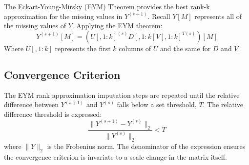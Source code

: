 \documentclass[12pt,twoside]{dukestatscithesis}
\theoremstyle{definition}
\theoremstyle{definition}
\theoremstyle{definition}
\theoremstyle{remark}
\begin{document}
The Eckart-Young-Mirsky (EYM) Theorem provides the best rank-k
approximation for the missing values in \(Y^{(s+1)}\). Recall \(Y[M]\)
represents all of the missing values of \(Y\). Applying the EYM theorem:
\[Y^{(s+1)}[M] = (U[,1:k]^{(s)}D[,1:k]V[,1:k]^{T(s)})[M]\] Where
\(U[,1:k]\) represents the first \(k\) columns of \(U\) and the same for
\(D\) and \(V\).

\subsection{Convergence Criterion}\label{convergence-criterion}

The EYM rank approximation imputation steps are repeated until the
relative difference between \(Y^{(s+1)}\) and \(Y^{(s)}\) falls below a
set threshold, \(T\). The relative difference threshold is expressed:
\[\frac{\|Y^{(s+1)}-Y^{(s)}\|_2}{\|Y^{(s)}\|_2} < T\] where \(\|Y\|_2\)
is the Frobenius norm. The denominator of the expression ensures the
convergence criterion is invariate to a scale change in the matrix
itself.
\end{document}

